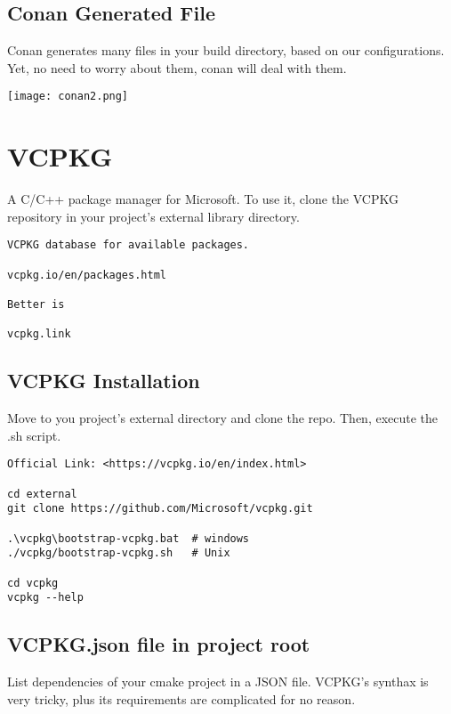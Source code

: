\subsection{Conan Generated File}

Conan generates many files in your build directory, based on our configurations. Yet, no need to worry about them, conan
will deal with them.


\begin{center}
    \texttt{[image: conan2.png]}
\end{center}

\section{VCPKG}

A C/C++ package manager for Microsoft. 
To use it, clone the VCPKG repository in your project's external library directory.

\begin{verbatim}
VCPKG database for available packages.

vcpkg.io/en/packages.html

Better is 

vcpkg.link 
\end{verbatim}

\subsection{VCPKG Installation}

Move to you project's external directory and clone the repo. Then, execute the .sh script.
 
\begin{verbatim}
Official Link: <https://vcpkg.io/en/index.html>

cd external
git clone https://github.com/Microsoft/vcpkg.git

.\vcpkg\bootstrap-vcpkg.bat  # windows
./vcpkg/bootstrap-vcpkg.sh   # Unix

cd vcpkg 
vcpkg --help 
\end{verbatim}


\subsection{VCPKG.json file in project root}

List dependencies of your cmake project in a JSON file. VCPKG's synthax is very tricky, plus its 
requirements are complicated for no reason.

